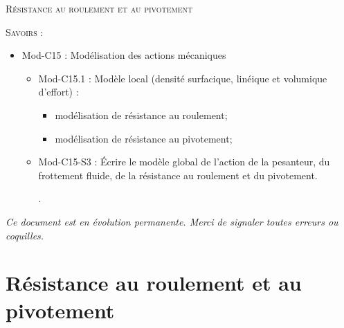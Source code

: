 \documentclass[10pt]{article}
\begin{document}


\begin{center}
\large{\textsc{Résistance au roulement et au pivotement}}
\end{center}

\vspace{.5cm}


\begin{savoir}
\textsc{Savoirs :}
\begin{itemize}
\item Mod-C15 : Modélisation des actions mécaniques
\begin{itemize}
\item Mod-C15.1 : Modèle local (densité surfacique, linéique et volumique d’effort) :
\begin{itemize}
\item modélisation de résistance au roulement;
\item modélisation de résistance au pivotement;
\end{itemize}
\end{itemize}
\begin{itemize}
\item Mod-C15-S3 : Écrire le modèle global de l’action de la pesanteur, du frottement fluide, de la résistance au roulement et du pivotement.

.
\end{itemize}
\end{itemize}
\end{savoir}

\setlength{\parskip}{0ex plus 0.2ex minus 0ex}
 \renewcommand{\contentsname}{}
 \renewcommand{\baselinestretch}{1}

\tableofcontents

 \renewcommand{\baselinestretch}{1.2}
\setlength{\parskip}{2ex plus 0.5ex minus 0.2ex}

\textit{Ce document est en évolution permanente. Merci de signaler toutes
erreurs ou coquilles.}


\section{Résistance au roulement et au pivotement}
\end{document}
